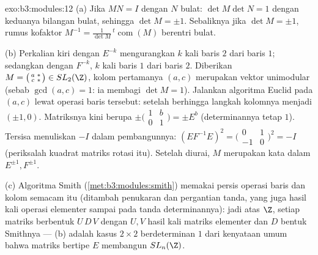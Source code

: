 \begin{solution}{exo:b3:modules:12}
(a) Jika $MN = I$ dengan $N$ bulat: $\det M\det N = 1$ dengan
keduanya bilangan bulat, sehingga $\det M = \pm1$. Sebaliknya jika $\det M =
\pm1$, rumus kofaktor $M^{-1} =
\frac1{\det M}\,{}^t\!\operatorname{com}(M)$ berentri bulat.

(b) Perkalian kiri dengan $E^{-k}$ mengurangkan $k$ kali baris
$2$ dari baris $1$; sedangkan dengan $F^{-k}$, $k$ kali baris $1$ dari baris
$2$. Diberikan $M = \bigl(\begin{smallmatrix}a & *\\ c &
*\end{smallmatrix}\bigr) \in SL_2(\Z)$, kolom pertamanya
$(a, c)$ merupakan vektor unimodular (sebab $\gcd(a, c) = 1$: ia
membagi $\det M = 1$). Jalankan algoritma Euclid pada $(a, c)$ lewat operasi
baris tersebut: setelah berhingga langkah kolomnya menjadi
$(\pm1, 0)$. Matriksnya kini berupa $\pm
\bigl(\begin{smallmatrix}1 & b\\ 0 & 1\end{smallmatrix}
\bigr) = \pm E^{b}$ (determinannya tetap $1$). Tersisa
menuliskan $-I$ dalam pembangunnya: $(EF^{-1}E)^2 =
\bigl(\begin{smallmatrix}0 & 1\\ -1 &
0\end{smallmatrix}\bigr)^2 = -I$ (periksalah kuadrat
matriks rotasi itu). Setelah diurai, $M$ merupakan kata dalam $E^{\pm1},
F^{\pm1}$.

(c) Algoritma Smith (\cref{met:b3:modules:smith}) memakai
persis operasi baris dan kolom semacam itu (ditambah penukaran dan pergantian
tanda, yang juga hasil kali operasi elementer sampai pada
tanda determinannya): jadi atas $\Z$, setiap matriks berbentuk
$U\,D\,V$ dengan $U, V$ hasil kali matriks elementer dan
$D$ bentuk Smithnya --- (b) adalah kasus $2\times2$ berdeterminan $1$
dari kenyataan umum bahwa matriks bertipe $E$ membangun
$SL_n(\Z)$.
\end{solution}

